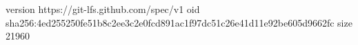 version https://git-lfs.github.com/spec/v1
oid sha256:4ed255250fe51b8c2ee3c2e0fcd891ac1f97dc51c26e41d11e92be605d9662fc
size 21960
